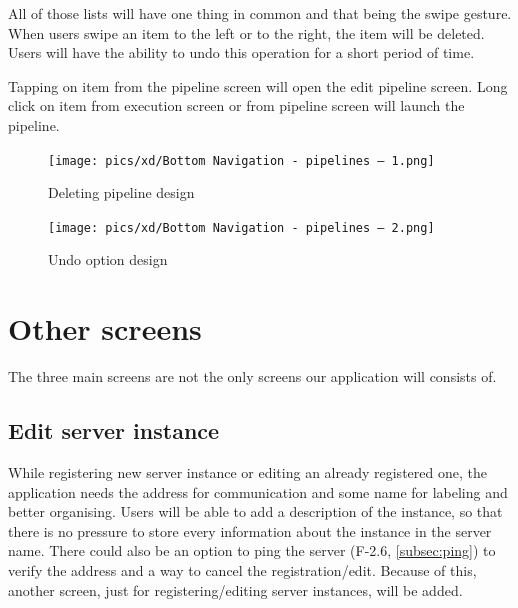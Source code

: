 All of those lists will have one thing in common and that being the swipe gesture.
When users swipe an item to the left or to the right, the item will be deleted.
Users will have the ability to undo this operation for a short period of time.

Tapping on item from the pipeline screen will open the edit pipeline screen.
Long click on item from execution screen or from pipeline screen will launch the pipeline.

\begin{figure}\centering
    \begin{minipage}[b]{0.32\textwidth}
    	\texttt{[image: pics/xd/Bottom Navigation - pipelines – 1.png]}
    	\caption[Deleting pipeline]{Deleting pipeline design}\label{fig:xdDeletePipeline}
    \end{minipage}
    \begin{minipage}[b]{0.32\textwidth}
    	\texttt{[image: pics/xd/Bottom Navigation - pipelines – 2.png]}
    	\caption[Undo option]{Undo option design}\label{fig:xdUndo}
    \end{minipage}
\end{figure}

\section{Other screens}
The three main screens are not the only screens our application will consists of.

\subsection{Edit server instance}
While registering new server instance or editing an already registered one, the application needs the address for communication and some name for labeling and better organising.
Users will be able to add a description of the instance, so that there is no pressure to store every information about the instance in the server name.
There could also be an option to ping the server (F-2.6, \autoref{subsec:ping}) to verify the address and a way to cancel the registration/edit.
Because of this, another screen, just for registering/editing server instances, will be added.

